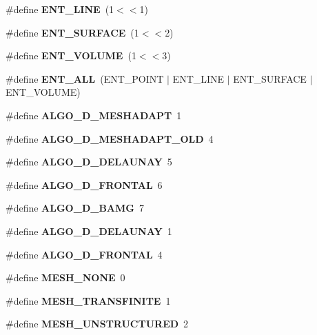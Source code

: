 \begin{DoxyCompactItemize}
\item 
\#define {\bfseries E\-N\-T\-\_\-\-L\-I\-N\-E}~(1$<$$<$1)\label{GmshDefines_8h_a8ae51870ae749c24275360d251f8514d}

\item 
\#define {\bfseries E\-N\-T\-\_\-\-S\-U\-R\-F\-A\-C\-E}~(1$<$$<$2)\label{GmshDefines_8h_aeaf9e513b450715d3aa8ea7965bc57c4}

\item 
\#define {\bfseries E\-N\-T\-\_\-\-V\-O\-L\-U\-M\-E}~(1$<$$<$3)\label{GmshDefines_8h_a74dd5c226a1d8238f1eb9693c9c184e4}

\item 
\#define {\bfseries E\-N\-T\-\_\-\-A\-L\-L}~(E\-N\-T\-\_\-\-P\-O\-I\-N\-T $\vert$ E\-N\-T\-\_\-\-L\-I\-N\-E $\vert$ E\-N\-T\-\_\-\-S\-U\-R\-F\-A\-C\-E $\vert$ E\-N\-T\-\_\-\-V\-O\-L\-U\-M\-E)\label{GmshDefines_8h_ac4dff5ffd1862116b775b9f86e2ee9c9}

\item 
\#define {\bfseries A\-L\-G\-O\-\_\-D\-\_\-\-M\-E\-S\-H\-A\-D\-A\-P\-T}~1\label{GmshDefines_8h_a3e6110760b72ce6b93e560059e9b48f3}

\item 
\#define {\bfseries A\-L\-G\-O\-\_\-D\-\_\-\-M\-E\-S\-H\-A\-D\-A\-P\-T\-\_\-\-O\-L\-D}~4\label{GmshDefines_8h_a0c12e20e44da1a02fb96863b8b821c8a}

\item 
\#define {\bfseries A\-L\-G\-O\-\_\-D\-\_\-\-D\-E\-L\-A\-U\-N\-A\-Y}~5\label{GmshDefines_8h_ad66c06add8ae9908fce0c2f511376afe}

\item 
\#define {\bfseries A\-L\-G\-O\-\_\-D\-\_\-\-F\-R\-O\-N\-T\-A\-L}~6\label{GmshDefines_8h_adf286326dbe29a86ce1914bd3931e164}

\item 
\#define {\bfseries A\-L\-G\-O\-\_\-D\-\_\-\-B\-A\-M\-G}~7\label{GmshDefines_8h_a5d3cdd9ebc6ff21a330c6a68561c77a5}

\item 
\#define {\bfseries A\-L\-G\-O\-\_\-D\-\_\-\-D\-E\-L\-A\-U\-N\-A\-Y}~1\label{GmshDefines_8h_a476ab442ec79cd917b5ce552b82500ac}

\item 
\#define {\bfseries A\-L\-G\-O\-\_\-D\-\_\-\-F\-R\-O\-N\-T\-A\-L}~4\label{GmshDefines_8h_a3c213699a0f4f9623eb8a9515fbd74c0}

\item 
\#define {\bfseries M\-E\-S\-H\-\_\-\-N\-O\-N\-E}~0\label{GmshDefines_8h_a3dc5afc32b47cd9f0eaea7039d248618}

\item 
\#define {\bfseries M\-E\-S\-H\-\_\-\-T\-R\-A\-N\-S\-F\-I\-N\-I\-T\-E}~1\label{GmshDefines_8h_a09df0ba0c4852324094650529d86f426}

\item 
\#define {\bfseries M\-E\-S\-H\-\_\-\-U\-N\-S\-T\-R\-U\-C\-T\-U\-R\-E\-D}~2\label{GmshDefines_8h_a40d310abcecd5d1acc82437d33bc7359}

\end{DoxyCompactItemize}


